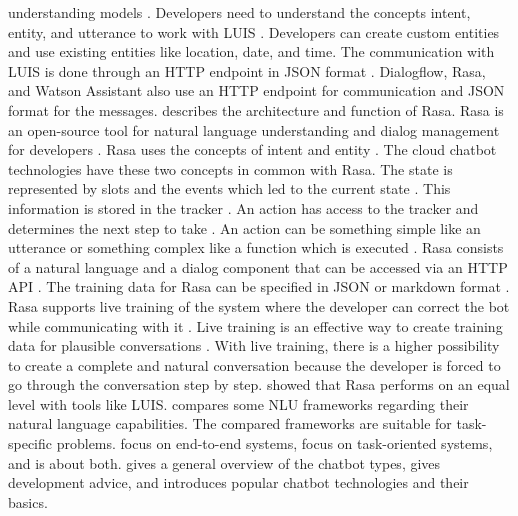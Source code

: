 understanding models \cite{luis2015williams}.
Developers need to understand the concepts intent, entity, and utterance to work with LUIS \cite{luis2015williams}.
Developers can create custom entities and use existing entities like location, date, and time.
The communication with LUIS is done through an HTTP endpoint in JSON format \cite{luis2015williams}. 
Dialogflow, Rasa, and Watson Assistant also use an HTTP endpoint for communication and JSON format for the messages. 
\citet{rasabocklisch2017} describes the architecture and function of Rasa.
Rasa is an open-source tool for natural language understanding and dialog management for developers \cite{rasabocklisch2017}.
Rasa uses the concepts of intent and entity \cite{rasabocklisch2017}. 
The cloud chatbot technologies have these two concepts in common with Rasa.
The state is represented by slots and the events which led to the current state \cite{rasabocklisch2017}. 
This information is stored in the tracker \cite{rasabocklisch2017}.
An action has access to the tracker and determines the next step to take \cite{rasabocklisch2017}. 
An action can be something simple like an utterance or something complex like a function which is executed \cite{rasabocklisch2017}.
Rasa consists of a natural language and a dialog component that can be accessed via an HTTP API \cite{rasabocklisch2017}.
The training data for Rasa can be specified in JSON or markdown format \cite{rasabocklisch2017}.
Rasa supports live training of the system where the developer can correct the bot while communicating with it \cite{rasabocklisch2017}.
Live training is an effective way to create training data for plausible conversations \cite{rasabocklisch2017}.
With live training, there is a higher possibility to create a complete and natural conversation because the 
developer is forced to go through the conversation step by step.
\citet{braunEvaluatingNLU} showed that Rasa performs on an equal level with tools like LUIS.
\citet{braunEvaluatingNLU} compares some NLU frameworks regarding their natural language capabilities.
The compared frameworks are suitable for task-specific problems.
\citet{evaluateChatbotsShawar2007,bordes2016learning,williams2017hybrid} 
focus on end-to-end systems, \citet{braunEvaluatingNLU, dutta2017developing,luis2015williams,rasabocklisch2017,pharmacybot,gregori2017evaluation}
focus on task-oriented systems, and \citet{singhbuilding} is about both.
\citet{singhbuilding} gives a general overview of the chatbot types, gives development advice, and introduces 
popular chatbot technologies and their basics.
